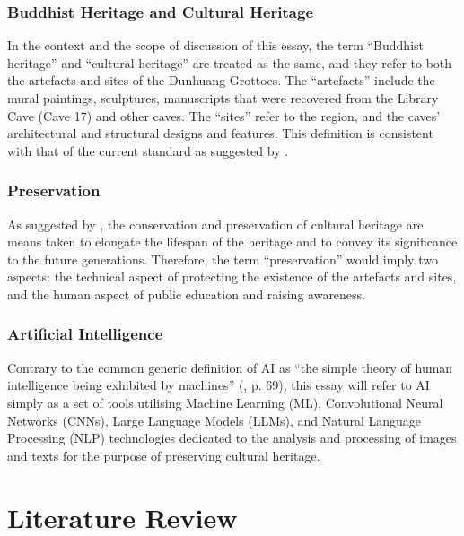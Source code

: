 \subsubsection{Buddhist Heritage and Cultural Heritage}

In the context and the scope of discussion of this essay, the term ``Buddhist heritage'' and ``cultural
heritage'' are treated as the same, and they refer to both the artefacts and sites of the Dunhuang Grottoes.
The ``artefacts'' include the mural paintings, sculptures, manuscripts that were recovered from the Library
Cave (Cave 17) and other caves. The ``sites'' refer to the region, and the caves' architectural and structural
designs and features. This definition is consistent with that of the current standard as suggested by
.

\subsubsection{Preservation}
\label{sec:preservation-definition}

As suggested by , the conservation and preservation of cultural heritage
are means taken to elongate the lifespan of the heritage and to convey its significance to the future
generations. Therefore, the term ``preservation'' would imply two aspects: the technical aspect of 
protecting the existence of the artefacts and sites, and the human aspect of public education and raising
awareness.

\subsubsection{Artificial Intelligence}

Contrary to the common generic definition of AI as ``the simple theory of human intelligence being
exhibited by machines'' (, p. 69), this essay will refer to AI simply
as a set of tools utilising Machine Learning (ML), Convolutional Neural Networks (CNNs), Large
Language Models (LLMs), and Natural Language Processing (NLP) technologies
dedicated to the analysis and processing of images and texts for the purpose of
preserving cultural heritage.

\section{Literature Review}

